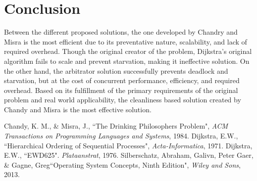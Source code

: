 \documentclass{article}
\begin{document}
\section{Conclusion} Between the different proposed solutions, the one developed by Chandry and Misra is the most efficient due to its preventative nature, scalability, and lack of required overhead. Though the original creator of the problem, Dijkstra's original algorithm fails to scale and prevent starvation, making it ineffective solution. On the other hand, the arbitrator solution successfully prevents deadlock and starvation, but at the cost of concurrent performance, efficiency, and required overhead. Based on its fulfillment of the primary requirements of the original problem and real world applicability, the cleanliness based solution created by Chandy and Misra is the most effective solution.

\begin{thebibliography}{100}

 Chandy, K. M., \& Misra, J., ``The Drinking Philosophers Problem", \emph{ACM Transactions on Programming Languages and Systems}, 1984.
 Dijkstra, E.W., ``Hierarchical Ordering of Sequential Processes", \emph{Acta-Informatica}, 1971.
 Dijkstra, E.W., ``EWD625". \emph{Plataanstrat}, 1976.
 Silberschatz, Abraham, Galivn, Peter Gaer, \& Gagne, Greg``Operating System Concepts, Ninth Edition", \emph{Wiley and Sons}, 2013.


\end{thebibliography}
\end{document}
